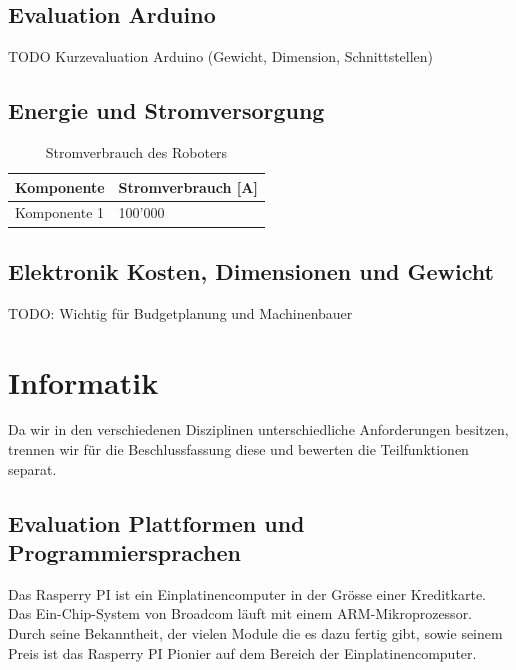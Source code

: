 \documentclass[a4paper]{report}
\begin{document}
\subsection{Evaluation Arduino}
TODO Kurzevaluation Arduino (Gewicht, Dimension, Schnittstellen)

\subsection{Energie und Stromversorgung}

\noindent
\begin{table}[h!]
	\begin{tabular}{|p{}|p{}|}
		\hline
		\textbf{Komponente} & \textbf{Stromverbrauch [A]} \\
		\hline
		Komponente 1 & 100'000\\
		\hline
	\end{tabular}
	\caption{Stromverbrauch des Roboters}
	\label{tab:stromverbrauchstabelle}
\end{table}

\subsection{Elektronik Kosten, Dimensionen und Gewicht}
TODO: Wichtig für Budgetplanung und Machinenbauer


\section{Informatik}
Da wir in den verschiedenen Disziplinen unterschiedliche Anforderungen besitzen, trennen wir für die Beschlussfassung diese und bewerten die Teilfunktionen separat.

\subsection{Evaluation Plattformen und Programmiersprachen}

Das Rasperry PI ist ein Einplatinencomputer in der Grösse einer
Kreditkarte. Das Ein-Chip-System von Broadcom läuft mit einem ARM-Mikroprozessor.
Durch seine Bekanntheit, der vielen Module die es dazu fertig gibt, sowie seinem Preis ist das Rasperry PI Pionier auf dem Bereich der Einplatinencomputer.
\end{document}
